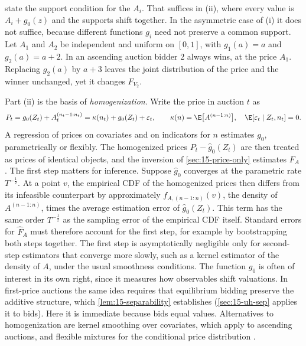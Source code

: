 \citet{AtheyHaile2002} state the support condition for the $A_i$. That suffices in (ii), where every value is
$A_i+g_0(z)$ and the supports shift together. In the asymmetric case of (i) it does not suffice, because
different functions $g_i$ need not preserve a common support. Let $A_1$ and $A_2$ be independent and uniform on
$[0,1]$, with $g_1(a)=a$ and $g_2(a)=a+2$. In an ascending auction bidder 2 always wins, at the price $A_1$.
Replacing $g_2(a)$ by $a+3$ leaves the joint distribution of the price and the winner unchanged, yet it changes
$F_{V_2}$.

Part (ii) is the basis of \emph{homogenization}. Write the price in auction $t$ as
\[
P_t=g_0(Z_t)+A_t^{(n_t-1:n_t)}=\kappa(n_t)+g_0(Z_t)+\varepsilon_t,
\qquad \kappa(n)=\E\big[A^{(n-1:n)}\big],\quad \E[\varepsilon_t\mid Z_t,n_t]=0 .
\]
A regression of prices on covariates and on indicators for $n$ estimates $g_0$, parametrically or flexibly. The
homogenized prices $P_t-\hat g_0(Z_t)$ are then treated as prices of identical objects, and the inversion of
\cref{sec:15-price-only} estimates $F_A$ \citep[equation~(6.6)]{AtheyHaile2007}. The first step matters for
inference. Suppose $\hat g_0$ converges at the parametric rate $T^{-\frac12}$. At a point $v$, the empirical CDF of
the homogenized prices then differs from its infeasible counterpart by approximately $f_{A,(n-1:n)}(v)$, the
density of $A^{(n-1:n)}$, times the average estimation error of $\hat g_0(Z_t)$. This term has the same order
$T^{-\frac12}$ as the sampling error of the empirical CDF itself.
Standard errors for $\hat F_A$ must therefore account for the first step, for example by bootstrapping both
steps together. The first step is asymptotically negligible only for second-step estimators that converge more
slowly, such as a kernel estimator of the density of $A$, under the usual smoothness conditions.
The function $g_0$ is often of interest in its own right, since it measures how observables shift valuations. In
first-price auctions the same idea requires that equilibrium bidding preserve the additive structure, which
\cref{lem:15-separability} establishes (\cref{sec:15-uh-sep} applies it to bids). Here it is immediate because
bids equal values. Alternatives to homogenization are
kernel smoothing over covariates, which \citet{HaileTamer2003} apply to ascending auctions, and flexible
mixtures for the conditional price distribution \citep[Section~6.1.1]{AtheyHaile2007}.

